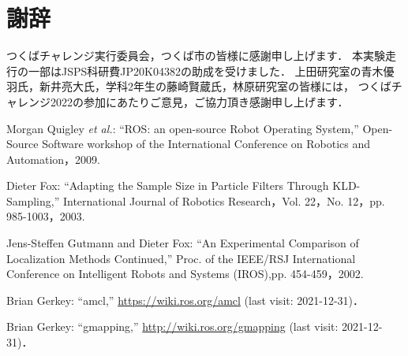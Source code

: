 \documentclass[twocolumn,9pt]{jsproceedings}
\begin{document}
\section*{謝辞}

つくばチャレンジ実行委員会，つくば市の皆様に感謝申し上げます．
本実験走行の一部はJSPS科研費JP20K04382の助成を受けました．
上田研究室の青木優羽氏，新井亮大氏，学科2年生の藤崎賢蔵氏，林原研究室の皆様には，
つくばチャレンジ2022の参加にあたりご意見，ご協力頂き感謝申し上げます．


\footnotesize
\begin{thebibliography}{99}
	  Morgan Quigley {\it et al.}: ``ROS: an open-source Robot Operating System,'' 
Open-Source Software workshop of the International Conference on Robotics and Automation，2009. 

Dieter Fox:
``Adapting the Sample Size in Particle Filters Through KLD-Sampling,''
International Journal of Robotics Research，Vol. 22，No. 12，pp. 985-1003，2003. 

Jens-Steffen Gutmann and Dieter Fox: 
``An Experimental Comparison of Localization Methods Continued,''
Proc. of the IEEE/RSJ International Conference on Intelligent Robots and Systems (IROS),pp. 454-459，2002.
  

  
  
  
  Brian Gerkey: ``amcl,'' \url{https://wiki.ros.org/amcl} (last visit: 2021-12-31)．

  Brian Gerkey: ``gmapping,'' \url{http://wiki.ros.org/gmapping} (last visit: 2021-12-31)．
  
  

\end{thebibliography}
\end{document}

